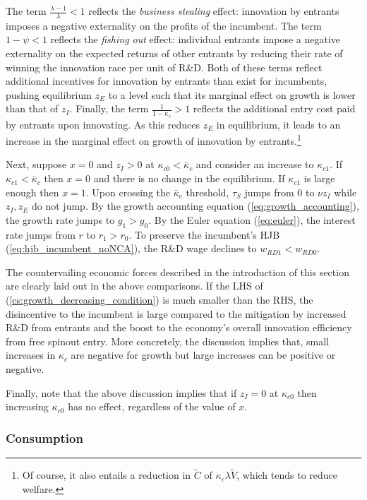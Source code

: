 \documentclass[11pt,english]{article}
\theoremstyle{remark}
\begin{document}
The term $\frac{\lambda - 1}{\lambda} < 1$ reflects the \textit{business stealing} effect: innovation by entrants imposes a negative externality on the profits of the incumbent. The term $1-\psi < 1$ reflects the \textit{fishing out} effect: individual entrants impose a negative externality on the expected returns of other entrants by reducing their rate of winning the innovation race per unit of R\&D. Both of these terms reflect additional incentives for innovation by entrants than exist for incumbents, pushing equilibrium $z_E$ to a level such that its marginal effect on growth is lower than that of $z_I$. Finally, the term $\frac{1}{1-\kappa_e} > 1$ reflects the additional entry cost paid by entrants upon innovating. As this reduces $z_E$ in equilibrium, it leads to an increase in the marginal effect on growth of innovation by entrants.\footnote{Of course, it also entails a reduction in $\tilde{C}$ of $\kappa_e \lambda \tilde{V}$, which tends to reduce welfare.}

Next, suppose $x = 0$ and $z_I > 0$ at $\kappa_{c0} < \bar{\kappa}_c$ and consider an increase to $\kappa_{c1}$. If $\kappa_{c1} < \bar{\kappa}_c$ then $x = 0$ and there is no change in the equilibrium. If $\kappa_{c1}$ is large enough then $x = 1$. Upon crossing the $\bar{\kappa}_c$ threshold, $\tau_S$ jumps from $0$ to $\nu z_I$ while $z_I,z_E$ do not jump. By the growth accounting equation (\ref{eq:growth_accounting}), the growth rate jumps to $g_1 > g_0$. By the Euler equation (\ref{eq:euler}), the interest rate jumps from $r$ to $r_1>r_0$. To preserve the incumbent's HJB (\ref{eq:hjb_incumbent_noNCA}), the R\&D wage declines to $w_{RD1} < w_{RD0}$.

The countervailing economic forces described in the introduction of this section are clearly laid out in the above comparisons. If the LHS of (\ref{cs:growth_decreasing_condition}) is much smaller than the RHS, the disincentive to the incumbent is large compared to the mitigation by increased R\&D from entrants and the boost to the economy's overall innovation efficiency from free spinout entry. More concretely, the discussion implies that, small increases in $\kappa_c$ are negative for growth but large increases can be positive or negative.

Finally, note that the above discussion implies that if $z_I = 0$ at $\kappa_{c0}$ then increasing $\kappa_{c0}$ has no effect, regardless of the value of $x$. 

\subsubsection{Consumption}\label{cs:consumption1}
\end{document}
